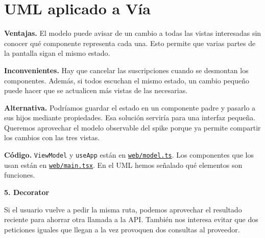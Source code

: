 \documentclass[10pt,a4paper]{article}
\newcommand{\titulo}[2]{{\LARGE\bfseries #1. #2}\par}
\newcommand{\apartado}[1]{\section*{\large #1}}
\newcommand{\fuente}[2]{\href{https://github.com/Kiliansito/ei1039-ei1048-movilidad/blob/dce2b57/entrega1/02_Spike/#1}{\texttt{\small #2}}}
\begin{document}
\apartado{UML aplicado a Vía}
\begin{center}\end{center}

\textbf{Ventajas.} El modelo puede avisar de un cambio a todas las vistas interesadas sin conocer qué componente representa cada una. Esto permite que varias partes de la pantalla sigan el mismo estado.

\textbf{Inconvenientes.} Hay que cancelar las suscripciones cuando se desmontan los componentes. Además, si todos escuchan el mismo estado, un cambio pequeño puede hacer que se actualicen más vistas de las necesarias.

\textbf{Alternativa.} Podríamos guardar el estado en un componente padre y pasarlo a sus hijos mediante propiedades. Esa solución serviría para una interfaz pequeña. Queremos aprovechar el modelo observable del spike porque ya permite compartir los cambios con las tres vistas.

\textbf{Código.} \texttt{ViewModel} y \texttt{useApp} están en \fuente{web/model.ts}{web/model.ts}. Los componentes que los usan están en \fuente{web/main.tsx}{web/main.tsx}. En el UML hemos señalado qué elementos son funciones.

\newpage
\titulo{5}{Decorator}
Si el usuario vuelve a pedir la misma ruta, podemos aprovechar el resultado reciente para ahorrar otra llamada a la API. También nos interesa evitar que dos peticiones iguales que llegan a la vez provoquen dos consultas al proveedor.
\end{document}
